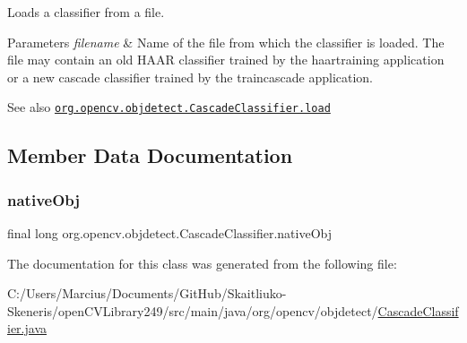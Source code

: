 Loads a classifier from a file.


\begin{DoxyParams}{Parameters}
{\em filename} & Name of the file from which the classifier is loaded. The file may contain an old H\+A\+AR classifier trained by the haartraining application or a new cascade classifier trained by the traincascade application.\\
\hline
\end{DoxyParams}
\begin{DoxySeeAlso}{See also}
\href{http://docs.opencv.org/modules/objdetect/doc/cascade_classification.html#cascadeclassifier-load}{\tt org.\+opencv.\+objdetect.\+Cascade\+Classifier.\+load} 
\end{DoxySeeAlso}


\subsection{Member Data Documentation}
\mbox{\label{classorg_1_1opencv_1_1objdetect_1_1_cascade_classifier_a62f0151eeb441d9e90f5f2df9fa29ae9}} 
\subsubsection{\texorpdfstring{native\+Obj}{nativeObj}}
{\footnotesize\ttfamily final long org.\+opencv.\+objdetect.\+Cascade\+Classifier.\+native\+Obj\hspace{0.3cm}{\ttfamily [protected]}}



The documentation for this class was generated from the following file\+:\begin{DoxyCompactItemize}
\item 
C\+:/\+Users/\+Marcius/\+Documents/\+Git\+Hub/\+Skaitliuko-\/\+Skeneris/open\+C\+V\+Library249/src/main/java/org/opencv/objdetect/\mbox{\hyperlink{_cascade_classifier_8java}{Cascade\+Classifier.\+java}}\end{DoxyCompactItemize}
